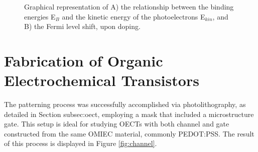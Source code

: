 \begin{figure}[ht]
	\centering
	\hspace{2em}
	\caption[Representation of the Fermi level shift upon doping]{ Graphical representation of A) the relationship between the binding energies E$_{B}$ and the kinetic energy of the photoelectrons E$_{kin}$, and B) the Fermi level shift, upon doping.} 
	\label{fig:ups}
\end{figure}


\section{Fabrication of Organic Electrochemical Transistors}
The patterning process was successfully accomplished via photolithography, as detailed in Section {subsec:oect}, employing a mask that included a microstructure gate. This setup is ideal for studying OECTs with both channel and gate constructed from the same OMIEC material, commonly PEDOT:PSS. The result of this process is displayed in Figure \ref{fig:channel}. 

